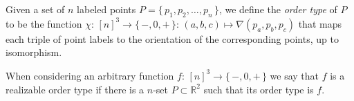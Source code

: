 \begin{definition}[name={Order Type of a Point Set},label={def:order-type}]
Given a set of \(n\) labeled points \(P = \{\, p_1, p_2, \ldots, p_n\,\}\), we
define the \emph{order type} of \(P\) to be the function
\(\chi \colon\, {[n]}^3 \to \{\, -, 0, +\,\}
\colon\, (a,b,c) \mapsto \nabla(p_a, p_b, p_c)\)
that maps each triple of point labels to the orientation of the corresponding
points, up to isomorphism.
\end{definition}
%
\begin{definition}[name={Realizable Order Type},label={def:realizable-order-type}]
When considering an arbitrary function \(f \colon\, {[n]}^3 \to \{\, -, 0,
+\,\}\) we say that \(f\) is a realizable order type if there is a
\(n\)-set \(P \subset \mathbb{R}^2\)
such that its order type is \(f\).
\end{definition}
